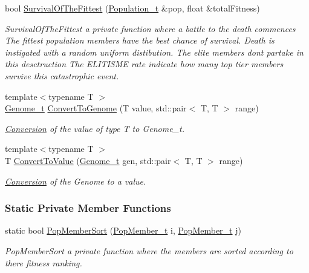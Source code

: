 \begin{DoxyCompactItemize}
bool \hyperlink{class_soil_math_1_1_g_a_ac2c10631815408d044738f678c67e98b}{Survival\+Of\+The\+Fittest} (\hyperlink{_soil_math_types_8h_a8d2d4c736cf817d048a2d66dec8b12ec}{Population\+\_\+t} \&pop, float \&total\+Fitness)
\begin{DoxyCompactList}\small\item\em Survival\+Of\+The\+Fittest a private function where a battle to the death commences The fittest population members have the best chance of survival. Death is instigated with a random uniform distibution. The elite members don\textquotesingle{}t partake in this desctruction The E\+L\+I\+T\+I\+S\+M\+E rate indicate how many top tier members survive this catastrophic event. \end{DoxyCompactList}\item 
{\footnotesize template$<$typename T $>$ }\\\hyperlink{_soil_math_types_8h_a58f6ab36d2cb0527a73caec36d14a0e0}{Genome\+\_\+t} \hyperlink{class_soil_math_1_1_g_a_a360250150f348af461259baf41477899}{Convert\+To\+Genome} (T value, std\+::pair$<$ T, T $>$ range)
\begin{DoxyCompactList}\small\item\em \hyperlink{class_conversion}{Conversion} of the value of type T to Genome\+\_\+t. \end{DoxyCompactList}\item 
{\footnotesize template$<$typename T $>$ }\\T \hyperlink{class_soil_math_1_1_g_a_aa4a6f59bd2e88d432a94d0159b8e8914}{Convert\+To\+Value} (\hyperlink{_soil_math_types_8h_a58f6ab36d2cb0527a73caec36d14a0e0}{Genome\+\_\+t} gen, std\+::pair$<$ T, T $>$ range)
\begin{DoxyCompactList}\small\item\em \hyperlink{class_conversion}{Conversion} of the Genome to a value. \end{DoxyCompactList}\end{DoxyCompactItemize}
\subsubsection*{Static Private Member Functions}
\begin{DoxyCompactItemize}
\item 
static bool \hyperlink{class_soil_math_1_1_g_a_a1e950022fa3ea792a36cbc62f9b8528b}{Pop\+Member\+Sort} (\hyperlink{_soil_math_types_8h_a7ded6c03705047ebe50207b22395dcd1}{Pop\+Member\+\_\+t} i, \hyperlink{_soil_math_types_8h_a7ded6c03705047ebe50207b22395dcd1}{Pop\+Member\+\_\+t} j)
\begin{DoxyCompactList}\small\item\em Pop\+Member\+Sort a private function where the members are sorted according to there fitness ranking. \end{DoxyCompactList}\end{DoxyCompactItemize}
